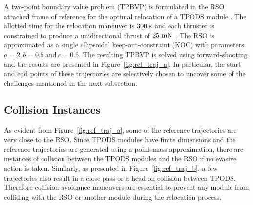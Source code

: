 A two-point boundary value problem (TPBVP) is formulated in the RSO attached frame of reference for the optimal relocation of a TPODS module \cite{Parikh2021}. The allotted time for the relocation maneuver is $300\ {\rm s}$ and each thruster is constrained to produce a unidirectional thrust of $25\ {\rm mN}$ \cite{TPODS_GNC24}. The RSO is approximated as a single ellipsoidal keep-out-constraint (KOC) with parameters $a=2,b=0.5\ $and$\ c=0.5$. The resulting TPBVP is solved using forward-shooting and the results are presented in Figure~\ref{fig:ref_traj_a}. In particular, the start and end points of these trajectories are selectively chosen to uncover some of the challenges mentioned in the next subsection.

\subsection{Collision Instances}
As evident from Figure~\ref{fig:ref_traj_a}, some of the reference trajectories are very close to the RSO. Since TPODS modules have finite dimensions and the reference trajectories are generated using a point-mass approximation, there are instances of collision between the TPODS modules and the RSO if no evasive action is taken. Similarly, as presented in Figure~\ref{fig:ref_traj_b}, a few trajectories also result in a close pass or a head-on collision between TPODS. Therefore collision avoidance maneuvers are essential to prevent any module from colliding with the RSO or another module during the relocation process.